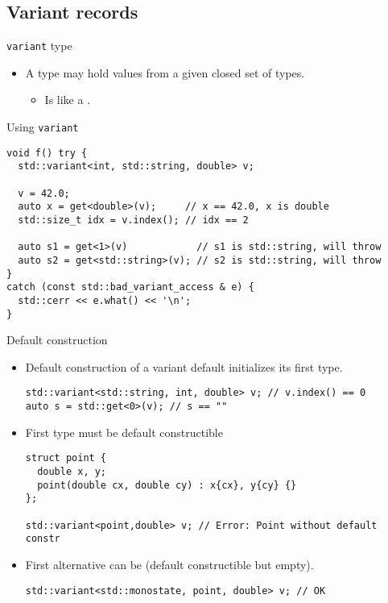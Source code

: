 \subsection{Variant records}

\begin{frame}[t,fragile]{\texttt{variant} type}
\begin{itemize}
  \item A  type may hold
        values from a given closed set of types.
    \begin{itemize}
      \item Is like a  .
    \end{itemize}
\end{itemize}
\begin{block}{Using \texttt{variant}}
\begin{lstlisting}
void f() try {
  std::variant<int, std::string, double> v;

  v = 42.0;
  auto x = get<double>(v);     // x == 42.0, x is double
  std::size_t idx = v.index(); // idx == 2

  auto s1 = get<1>(v)            // s1 is std::string, will throw
  auto s2 = get<std::string>(v); // s2 is std::string, will throw  
} 
catch (const std::bad_variant_access & e) {
  std::cerr << e.what() << '\n';
}
\end{lstlisting}
\end{block}
\end{frame}

\begin{frame}[t,fragile]{Default construction}
\begin{itemize}
  \item Default construction of a variant default initializes its first type.
\begin{lstlisting}
std::variant<std::string, int, double> v; // v.index() == 0
auto s = std::get<0>(v); // s == ""
\end{lstlisting}

  \item First type must be default constructible
\begin{lstlisting}
struct point {
  double x, y;
  point(double cx, double cy) : x{cx}, y{cy} {}
};

std::variant<point,double> v; // Error: Point without default constr
\end{lstlisting}

  \item First alternative can be  
        (default constructible but empty).
\begin{lstlisting}
std::variant<std::monostate, point, double> v; // OK
\end{lstlisting}

\end{itemize}
\end{frame}

